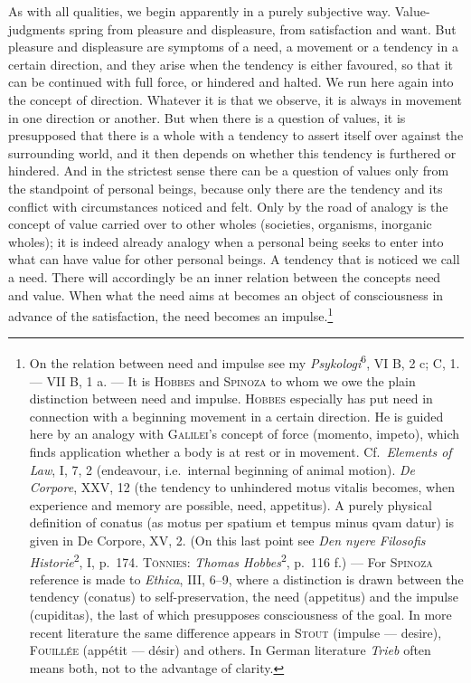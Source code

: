 \documentclass[12pt]{book}
\begin{document}
As with all qualities, we begin apparently in a purely subjective way. Value-judgments
spring from pleasure and displeasure, from satisfaction and want. But pleasure and
displeasure are symptoms of a need, a movement or a tendency in a certain direction,
and they arise when the tendency is either favoured, so that it can be continued with
full force, or hindered and halted. We run here again into the concept of direction.
Whatever it is that we observe, it is always in movement in one direction or another.
But when there is a question of values, it is presupposed that there is a whole with a
tendency to assert itself over against the surrounding world, and it then depends on
whether this tendency is furthered or hindered. And in the strictest sense there can
be a question of values only from the standpoint of personal beings, because only
there are the tendency and its conflict with circumstances noticed and felt. Only by
the road of analogy is the concept of value carried over to other wholes (societies,
organisms, inorganic wholes); it is indeed already analogy when a personal being seeks
to enter into what can have value for other personal beings. A tendency that is
noticed we call a need. There will accordingly be an inner relation between the
concepts need and value. When what the need aims at becomes an object of consciousness
in advance of the satisfaction, the need becomes an impulse.\footnote{On the relation
between need and impulse see my \textit{Psykologi}\textsuperscript{6}, VI B, 2 c;
C, 1. --- VII B, 1 a. --- It is \textsc{Hobbes} and \textsc{Spinoza} to whom we owe
the plain distinction between need and impulse. \textsc{Hobbes} especially has put
need in connection with a beginning movement in a certain direction. He is guided here
by an analogy with \textsc{Galilei}'s concept of force (momento, impeto), which finds
application whether a body is at rest or in movement. Cf.\ \textit{Elements of Law},
I, 7, 2 (endeavour, i.e.\ internal beginning of animal motion). \textit{De Corpore},
XXV, 12 (the tendency to unhindered motus vitalis becomes, when experience and memory
are possible, need, appetitus). A purely physical definition of conatus (as motus per
spatium et tempus minus qvam datur) is given in De Corpore, XV, 2. (On this last point
see \textit{Den nyere Filosofis Historie}\textsuperscript{2}, I, p.\ 174.
\textsc{Tönnies}: \textit{Thomas Hobbes}\textsuperscript{2}, p.\ 116 f.) --- For
\textsc{Spinoza} reference is made to \textit{Ethica}, III, 6--9, where a distinction
is drawn between the tendency (conatus) to self-preservation, the need (appetitus) and
the impulse (cupiditas), the last of which presupposes consciousness of the goal. In
more recent literature the same difference appears in \textsc{Stout} (impulse ---
desire), \textsc{Fouillée} (appétit --- désir) and others. In German literature
\textit{Trieb} often means both, not to the advantage of clarity.}
\end{document}
